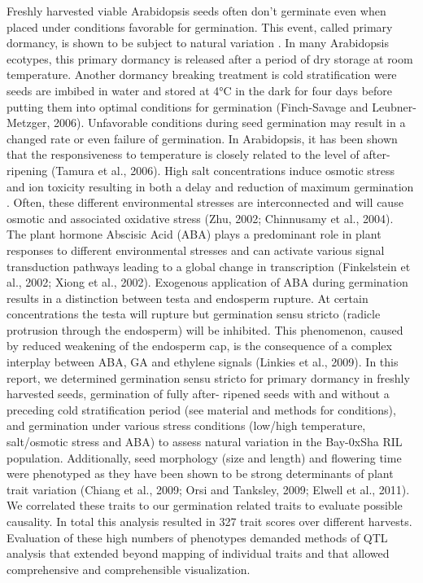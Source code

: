 \documentclass[8pt, twoside, a5paper]{report}
\begin{document}
Freshly harvested viable Arabidopsis seeds often don’t germinate even when placed under conditions favorable for germination. This event, 
called primary dormancy, is shown to be subject to natural variation \cite{Bentsink:2010}. In many Arabidopsis ecotypes, this primary 
dormancy is released after a period of dry storage at room temperature. Another dormancy breaking treatment is cold stratification were 
seeds are imbibed in water and stored at 4°C in the dark for four days before putting them into optimal conditions for germination 
(Finch-Savage and Leubner-Metzger, 2006). Unfavorable conditions during seed germination may result in a changed rate or even failure 
of germination. In Arabidopsis, it has been shown that the responsiveness to temperature is closely related to the level of after-ripening 
(Tamura et al., 2006). High salt concentrations induce osmotic stress and ion toxicity resulting in both a delay and reduction of maximum 
germination \cite{Galpaz:2010}. Often, these different environmental stresses are interconnected and will cause osmotic and 
associated oxidative stress (Zhu, 2002; Chinnusamy et al., 2004). The plant hormone Abscisic Acid (ABA) plays a predominant role in 
plant responses to different environmental stresses and can activate various signal transduction pathways leading to a global change in 
transcription (Finkelstein et al., 2002; Xiong et al., 2002). Exogenous application of ABA during germination results in a distinction 
between testa and endosperm rupture. At certain concentrations the testa will rupture but germination sensu stricto (radicle protrusion 
through the endosperm) will be inhibited. This phenomenon, caused by reduced weakening of the endosperm cap, is the consequence of a 
complex interplay between ABA, GA and ethylene signals (Linkies et al., 2009). In this report, we determined germination sensu stricto 
for primary dormancy in freshly harvested seeds, germination of fully after- ripened seeds with and without a preceding cold stratification
period (see material and methods for conditions), and germination under various stress conditions (low/high temperature, salt/osmotic 
stress and ABA) to assess natural  variation in the Bay-0xSha RIL population. Additionally, seed morphology (size and length) and flowering 
time were phenotyped as they have been shown to be strong determinants of plant trait variation (Chiang et al., 2009; Orsi and Tanksley, 
2009; Elwell et al., 2011). We correlated these traits to our germination related traits to evaluate possible causality. In total this 
analysis resulted in 327 trait scores over different harvests. Evaluation of these high numbers of phenotypes demanded methods of QTL
analysis that extended beyond mapping of individual traits and that allowed comprehensive and comprehensible visualization.
\end{document}
